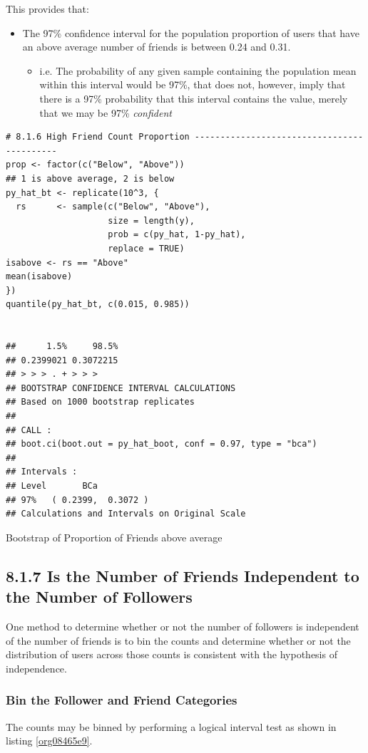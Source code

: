 \documentclass[11pt]{article}
\begin{document}
This provides that:
\begin{itemize}
\item The 97\% confidence interval for the population proportion of users that have
an above average number of friends is between 0.24 and 0.31.
\begin{itemize}
\item i.e. The probability of any given sample containing the population mean
within this interval would be 97\%, that does not, however, imply that there is
a 97\% probability that this interval contains the value, merely that we may
be 97\% \emph{confident}
\end{itemize}
\end{itemize}

\begin{listing}[htbp]
\begin{verbatim}
# 8.1.6 High Friend Count Proportion -------------------------------------------
prop <- factor(c("Below", "Above"))
## 1 is above average, 2 is below
py_hat_bt <- replicate(10^3, {
  rs      <- sample(c("Below", "Above"),
                    size = length(y),
                    prob = c(py_hat, 1-py_hat),
                    replace = TRUE)
isabove <- rs == "Above"
mean(isabove)
})
quantile(py_hat_bt, c(0.015, 0.985))


##      1.5%     98.5%
## 0.2399021 0.3072215
## > > > . + > > >
## BOOTSTRAP CONFIDENCE INTERVAL CALCULATIONS
## Based on 1000 bootstrap replicates
##
## CALL :
## boot.ci(boot.out = py_hat_boot, conf = 0.97, type = "bca")
##
## Intervals :
## Level       BCa
## 97%   ( 0.2399,  0.3072 )
## Calculations and Intervals on Original Scale
\end{verbatim}
\caption{\label{org41ad471}Bootstrap of Proportion of Friends above average}
\end{listing}
\subsection{8.1.7 Is the Number of Friends Independent to the Number of Followers}
\label{sec:org940f258}
One method to determine whether or not the number of followers is independent of the number of friends is to bin the counts and determine whether or not the distribution of users across those counts is consistent with the hypothesis of independence.

\subsubsection{Bin the Follower and Friend Categories}
\label{sec:org929aa2c}
The counts may be binned by performing a logical interval test as shown in listing \ref{org08465e9}.
\end{document}
